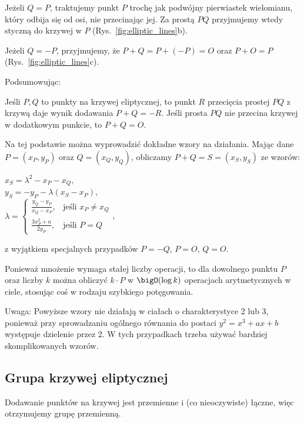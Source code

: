 Jeżeli \( Q = P \), traktujemy punkt \( P \) trochę jak podwójny pierwiastek wielomianu, który odbija się od osi, nie przecinając jej.
Za prostą \( PQ \) przyjmujemy wtedy styczną do krzywej w \( P \) (Rys.~\ref{fig:elliptic_lines}b).

Jeżeli \( Q = -P \), przyjmujemy, że \( P + Q = P + (-P) = O \) oraz \(P + O = P \) (Rys.~\ref{fig:elliptic_lines}c).

Podsumowując:
\begin{definition}[Dodawanie]
    Jeśli \( P, Q \) to punkty na krzywej eliptycznej, to punkt \( R \) przecięcia prostej \( PQ \) z krzywą daje wynik dodawania \( P + Q = -R \).
    Jeśli prosta \( PQ \) nie przecina krzywej w dodatkowym punkcie, to \( P + Q = O \).
\end{definition}

Na tej podstawie można wyprowadzić dokładne wzory na działania. Mając dane \( P = (x_P, y_P) \) oraz \( Q = (x_Q, y_Q) \), obliczamy \( P + Q = S = (x_S , y_S ) \) ze wzorów:
\begin{center}
    \( x_S = \lambda^2 - x_P - x_Q, \) \\
    \( y_S = -y_P - \lambda(x_S - x_P), \) \\
    \( \lambda = 
    \begin{cases}
        \frac{y_Q - y_P}{x_Q - x_P}, & \text{jeśli } x_P \ne x_Q \\
        \frac{3x_P^2 + a}{2y_P}, & \text{jeśli } P = Q
    \end{cases} \),
\end{center}
z wyjątkiem specjalnych przypadków \( P = -Q \), \( P = O \), \( Q = O \).

Ponieważ mnożenie wymaga stałej liczby operacji, to dla dowolnego punktu \( P \) oraz liczby \( k \) można obliczyć \( k \cdot P \) w \( \bigO(\log k) \) operacjach arytmetycznych w ciele, stosując coś w rodzaju szybkiego potęgowania.

Uwaga: Powyższe wzory nie działają w ciałach o charakterystyce 2 lub 3, ponieważ przy sprowadzaniu ogólnego równania do postaci \( y^2 = x^3 + ax + b \) występuje dzielenie przez 2.
W tych przypadkach trzeba używać bardziej skomplikowanych wzorów.

\subsection{Grupa krzywej eliptycznej}
Dodawanie punktów na krzywej jest przemienne i (co nieoczywiste) łączne, więc otrzymujemy grupę przemienną.

